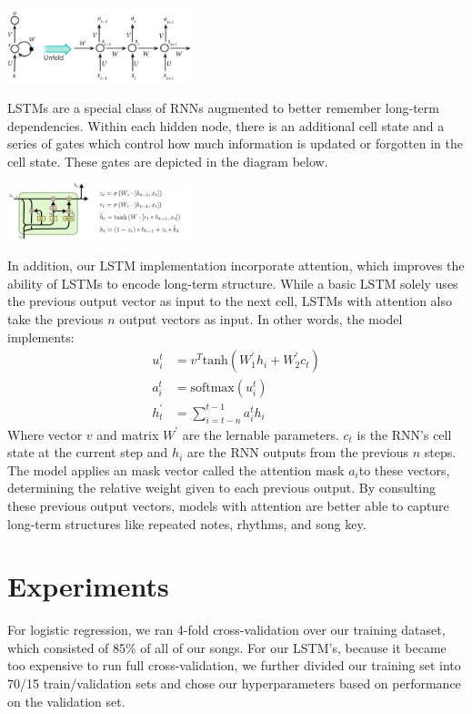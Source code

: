 \documentclass[twoside,twocolumn]{article}
\begin{document}
\includegraphics[width = 0.4\textwidth]{rnn-diagram}

LSTMs are a special class of RNNs augmented to better remember long-term dependencies. Within each hidden node, there is an additional cell state and a series of gates which control how much information is updated or forgotten in the cell state. These gates are depicted in the diagram below.

\includegraphics[width = 0.4\textwidth]{colah-lstm-diagram}

In addition, our LSTM implementation incorporate attention, which improves the ability of LSTMs to encode long-term structure. While a basic LSTM solely uses the previous output vector as input to the next cell, LSTMs with attention also take the previous $n$ output vectors as input. In other words, the model implements:
\begin{align}
u_i^t &= v^T \text{tanh}(W_1^\prime h_i + W_2^\prime c_t) \\
a_i^t &= \text{softmax}(u_i^t) \\
h_t^\prime &= \sum_{i=t-n}^{t-1} a_i^t h_i
\end{align}
Where vector $v$ and matrix $W^\prime$ are the lernable parameters. $c_t$ is the RNN's cell state at the current step and $h_i$ are the RNN outputs from the previous $n$ steps. The model applies an mask vector called the attention mask  $a_i$to these vectors, determining the relative weight given to each previous output. By consulting these previous output vectors, models with attention are better able to capture long-term structures like repeated notes, rhythms, and song key. \\


\section{Experiments}

For logistic regression, we ran 4-fold cross-validation over our training dataset, which consisted of 85\% of all of our songs. For our LSTM's, because it became too expensive to run full cross-validation, we further divided our training set into 70/15 train/validation sets and chose our hyperparameters based on performance on the  validation set. 
\end{document}

